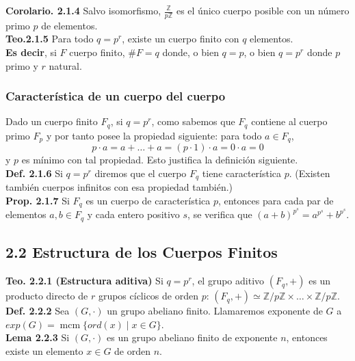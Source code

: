 \documentclass{article}
\begin{document}
\textbf{Corolario. 2.1.4}
Salvo isomorfismo, $\frac{\mathbb{Z}}{p\mathbb{Z}}$ es el único cuerpo posible con un número primo $p$ de elementos.\\

\textbf{Teo.2.1.5}
Para todo $q=p^r$, existe un cuerpo finito con $q$ elementos. \\

    \noindent \textbf{Es decir}, si $F$ cuerpo finito, $\# F = q$ donde, o bien $q = p$, o bien $q = p^r$ donde $p$ primo y $r$ natural. 

\subsubsection{Característica de un cuerpo del cuerpo} 
Dado un cuerpo finito $F_{q}$, si $q = p^r$, como sabemos que $F_{q}$ contiene al cuerpo primo $F_{p}$ y por tanto posee la propiedad siguiente: para todo $a \in F_{q}$,
\[
	p \cdot a = a + \dots + a = (p \cdot 1) \cdot a = 0 \cdot a = 0 
\]
y $p$ es mínimo con tal propiedad. Esto justifica la definición siguiente. \\

\textbf{Def. 2.1.6}  Si $q = p^r$ diremos que el cuerpo $F_q$ tiene característica $p$.
(Existen también cuerpos infinitos con esa propiedad también.)\\

\textbf{Prop. 2.1.7} Si $F_q$ es un cuerpo de característica $p$, entonces para cada par de elementos $a, b \in F_q$ y cada entero positivo $s$, se verifica que $(a+b)^{p^s} = a^{p^s} + b^{p^s}$.

\subsection{2.2 Estructura de los Cuerpos Finitos}

\textbf{Teo. 2.2.1 (Estructura aditiva)} Si $q=p^r$, el grupo aditivo $(F_q, +)$ es un producto directo de $r$ grupos cíclicos de orden $p$: $(F_q, +) \simeq \mathbb{Z}/p\mathbb{Z} \times \dots \times \mathbb{Z}/p\mathbb{Z}$.\\

\textbf{Def. 2.2.2} Sea $(G, \cdot)$ un grupo abeliano finito. Llamaremos exponente de $G$ a $exp(G) = \operatorname{mcm}\{ord(x) \mid x \in G\}$.\\

\textbf{Lema 2.2.3} Si $(G, \cdot)$ es un grupo abeliano finito de exponente $n$, entonces existe un elemento $x \in G$ de orden $n$.\\
\end{document}

